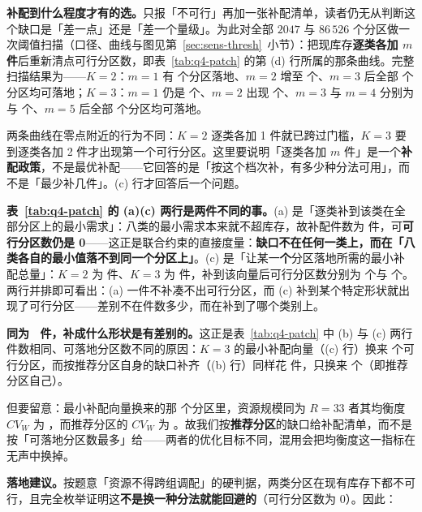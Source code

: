 \textbf{补配到什么程度才有的选。}只报「不可行」再加一张补配清单，读者仍无从判断这个缺口是「差一点」还是「差一个量级」。为此对全部 $2047$ 与 $86\,526$ 个分区做一次阈值扫描（口径、曲线与图见第~\ref{sec:sens-thresh}~小节）：把现库存\textbf{逐类各加 $m$ 件}后重新清点可行分区数，即表~\ref{tab:q4-patch} 的第 (d) 行所属的那条曲线。完整扫描结果为——$K=2$：$m=1$ 有 \mtQfourThreshKTwoMOne 个分区落地、$m=2$ 增至 \mtQfourThreshKTwoMTwo 个、$m=3$ 后全部 \mtQfourThreshKTwoMThree 个分区均可落地；$K=3$：$m=1$ 仍是 \mtQfourThreshKThreeMOne 个、$m=2$ 出现 \mtQfourThreshKThreeMTwo 个、$m=3$ 与 $m=4$ 分别为 \mtQfourThreshKThreeMThree 与 \mtQfourThreshKThreeMFour 个、$m=5$ 后全部 \mtQfourThreshKThreeMFive 个分区均可落地。

两条曲线在零点附近的行为不同：$K=2$ 逐类各加 1 件就已跨过门槛，$K=3$ 要到逐类各加 2 件才出现第一个可行分区。这里要说明「逐类各加 $m$ 件」是一个\textbf{补配政策}，不是最优补配——它回答的是「按这个档次补，有多少种分法可用」，而不是「最少补几件」。(c) 行才回答后一个问题。

\textbf{表~\ref{tab:q4-patch} 的 (a)(c) 两行是两件不同的事。}(a) 是「逐类补到该类在全部分区上的最小需求」：八类的最小需求本来就不超库存，故补配件数为 \mtQfourPerClassMinPatch 件，可\textbf{可行分区数仍是 0}——这正是联合约束的直接度量：\textbf{缺口不在任何一类上，而在「八类各自的最小值落不到同一个分区上」}。(c) 是「让某一\textbf{个}分区落地所需的最小补配总量」：$K=2$ 为 \mtQfourMinPatchKTwo 件、$K=3$ 为 \mtQfourMinPatchKThree 件，补到该向量后可行分区数分别为 \mtQfourMinPatchFeasKTwo 个与 \mtQfourMinPatchFeasKThree 个。两行并排即可看出：(a) 一件不补凑不出可行分区，而 (c) 补到某个特定形状就出现了可行分区——差别不在件数多少，而在补到了哪个类别上。

\textbf{同为 \mtQfourMinPatchKThree\ 件，补成什么形状是有差别的。}这正是表~\ref{tab:q4-patch} 中 (b) 与 (c) 两行件数相同、可落地分区数不同的原因：$K=3$ 的最小补配向量（(c) 行）换来 \mtQfourMinPatchFeasKThree 个可行分区，而按推荐分区自身的缺口补齐（(b) 行）同样花 \mtQfourMinPatchKThree 件，只换来 \mtQfourRecGapFeasKThree 个（即推荐分区自己）。

但要留意：最小补配向量换来的那 \mtQfourMinPatchFeasKThree 个分区里，资源规模同为 $R=33$ 者其均衡度 $CV_W$ 为 \mtQfourMinPatchCVKThree，而推荐分区的 $CV_W$ 为 \mtQfourCV。故我们按\textbf{推荐分区}的缺口给补配清单，而不是按「可落地分区数最多」给——两者的优化目标不同，混用会把均衡度这一指标在无声中换掉。

\textbf{落地建议。}按题意「资源不得跨组调配」的硬判据，两类分区在现有库存下都不可行，且完全枚举证明这\textbf{不是换一种分法就能回避的}（可行分区数为 0）。因此：

